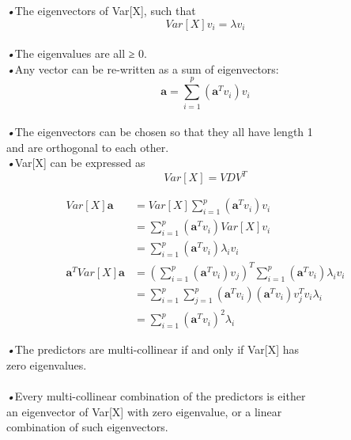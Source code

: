 \documentclass{beamer}
\begin{document}
	\begin{frame}
	\emph{•}The eigenvectors of Var[X], such that
	\begin{equation*}
		Var\left[ X\right] v_i=\lambda v_i
	\end{equation*}
	\\\emph{•}The eigenvalues are all ≥ 0.
	\\\emph{•}Any vector can be re-written as a sum of eigenvectors:
	\begin{equation*}
		\textbf{a}=\sum_{i=1}^{p}\left( \textbf{a}^{T} v_i\right) v_i
	\end{equation*}
	\\\emph{•}The eigenvectors can be chosen so that they all have length 1
	\\\quad and are orthogonal to each other.
	\\\emph{•}Var[X] can be expressed as 
	\begin{equation*}
		Var\left[ X\right] = VDV^{T}
	\end{equation*}
\end{frame}

	\begin{frame}
			\begin{equation*}
		\begin{aligned}
		Var\left[ X\right] \textbf{a} &= Var\left[ X\right]\sum_{i=1}^{p}\left( \textbf{a}^{T} v_i\right) v_i
		\\&=\sum_{i=1}^{p}\left( \textbf{a}^{T} v_i\right)Var\left[ X\right]v_i
		\\&=\sum_{i=1}^{p}\left( \textbf{a}^{T} v_i\right)\lambda_i v_i
		\\\textbf{a}^{T} Var\left[ X\right]\textbf{a}  
		&= \left( \sum_{i=1}^{p}\left( \textbf{a}^{T} v_i\right)v_j\right) ^{T} \sum_{i=1}^{p}\left( \textbf{a}^{T} v_i\right)\lambda_i v_i
		\\&=\sum_{i=1}^{p}\sum_{j=1}^{p}\left( \textbf{a}^{T} v_i\right)\left( \textbf{a}^{T} v_i\right)v_j^{T} v_i\lambda_i
		\\&=\sum_{i=1}^{p}\left( \textbf{a}^{T} v_i\right)^2\lambda_i
		\end{aligned}
		\end{equation*}
	\end{frame}
	\begin{frame}
	\emph{•}The predictors are multi-collinear if and only if Var[X] has  
	\\\quad zero eigenvalues.
	\\\mbox{}
	\\\emph{•}Every multi-collinear combination of the predictors is either 
	\\\quad an  eigenvector of Var[X] with zero eigenvalue, or a linear 
	\\\quad combination of such eigenvectors.
\end{frame}
\end{document}

